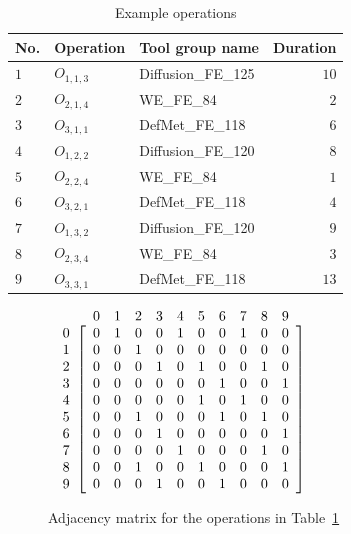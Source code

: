 \documentclass[runningheads]{llncs}
\begin{document}
\begin{table}[t]
	\caption{Example operations}\label{tab:operations} \centering
	\begin{tabular}{lllr}
		\hline
		No. & Operation & Tool group name & Duration\\ \hline
		$1$ & $O_{1,1,3}$ & Diffusion\_FE\_125 & $10$ \\
		$2$ & $O_{2,1,4}$ & WE\_FE\_84         & $2$ \\
		$3$ & $O_{3,1,1}$ & DefMet\_FE\_118    & $6$ \\
		$4$ & $O_{1,2,2}$ & Diffusion\_FE\_120 & $8$ \\
		$5$ & $O_{2,2,4}$ & WE\_FE\_84         & $1$ \\
		$6$ & $O_{3,2,1}$ & DefMet\_FE\_118    & $4$ \\
		$7$ & $O_{1,3,2}$ & Diffusion\_FE\_120 & $9$ \\
		$8$ & $O_{2,3,4}$ & WE\_FE\_84         & $3$ \\
		$9$ & $O_{3,3,1}$ & DefMet\_FE\_118    & $13$ \\
		\hline
	\end{tabular}
\end{table}
%
\begin{figure}[h]
	\centering 
	$\begin{array}{c@{}c}
		& \begin{array}{cccccccccc} 0 & 1 & 2 & 3 & 4 & 5 & 6 & 7 & 8 & 9 \end{array} \\
		\begin{array}{c} 0 \\ 1 \\ 2 \\ 3 \\ 4 \\ 5 \\ 6 \\ 7 \\ 8 \\ 9 \end{array} &
		\left[\begin{array}{cccccccccc}
			0 & 1 & 0 & 0 & 1 & 0 & 0 & 1 & 0 & 0 \\
			0 & 0 & 1 & 0 & 0 & 0 & 0 & 0 & 0 & 0 \\
			0 & 0 & 0 & 1 & 0 & 1 & 0 & 0 & 1 & 0 \\
			0 & 0 & 0 & 0 & 0 & 0 & 1 & 0 & 0 & 1 \\
			0 & 0 & 0 & 0 & 0 & 1 & 0 & 1 & 0 & 0 \\
			0 & 0 & 1 & 0 & 0 & 0 & 1 & 0 & 1 & 0 \\
			0 & 0 & 0 & 1 & 0 & 0 & 0 & 0 & 0 & 1 \\
			0 & 0 & 0 & 0 & 1 & 0 & 0 & 0 & 1 & 0 \\
			0 & 0 & 1 & 0 & 0 & 1 & 0 & 0 & 0 & 1 \\
			0 & 0 & 0 & 1 & 0 & 0 & 1 & 0 & 0 & 0 \\
		\end{array}\right]
	\end{array}$
	\caption{Adjacency matrix for the operations in Table~\ref{tab:operations}}
	\label{fig:a}
\end{figure}
\end{document}
